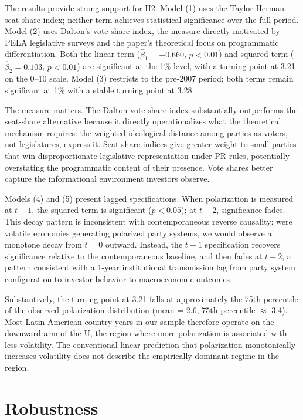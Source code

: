 \documentclass[12pt]{article}
\begin{document}
The results provide strong support for H2. Model (1) uses the
Taylor-Herman seat-share index; neither term achieves statistical
significance over the full period. Model (2) uses Dalton's vote-share
index, the measure directly motivated by PELA legislative surveys and the
paper's theoretical focus on programmatic differentiation. Both the linear
term ($\hat{\beta}_1 = -0.660$, $p < 0.01$) and squared term
($\hat{\beta}_2 = 0.103$, $p < 0.01$) are significant at the 1\% level,
with a turning point at 3.21 on the 0--10 scale. Model (3) restricts to the
pre-2007 period; both terms remain significant at 1\% with a stable turning
point at 3.28.

The measure matters. The Dalton vote-share index substantially outperforms
the seat-share alternative because it directly operationalizes what the
theoretical mechanism requires: the weighted ideological distance among
parties as voters, not legislatures, express it. Seat-share indices give
greater weight to small parties that win disproportionate legislative
representation under PR rules, potentially overstating the programmatic
content of their presence. Vote shares better capture the informational
environment investors observe.

Models (4) and (5) present lagged specifications. When polarization is
measured at $t-1$, the squared term is significant ($p < 0.05$); at $t-2$,
significance fades. This decay pattern is inconsistent with contemporaneous
reverse causality: were volatile economies generating polarized party systems,
we would observe a monotone decay from $t=0$ outward. Instead, the $t-1$
specification recovers significance relative to the contemporaneous baseline,
and then fades at $t-2$, a pattern consistent with a 1-year institutional
transmission lag from party system configuration to investor behavior to
macroeconomic outcomes.

Substantively, the turning point at 3.21 falls at approximately the 75th
percentile of the observed polarization distribution (mean = 2.6, 75th
percentile $\approx$ 3.4). Most Latin American country-years in our sample
therefore operate on the downward arm of the U, the region where more
polarization is associated with less volatility. The conventional linear
prediction that polarization monotonically increases volatility does not
describe the empirically dominant regime in the region.

\section{Robustness}
\end{document}
